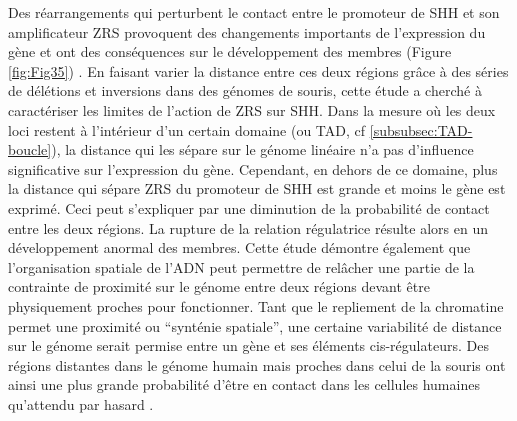Des réarrangements qui perturbent le contact entre le promoteur de \acrshort{SHH} et son \gls{amplificateur} \acrshort{ZRS} provoquent des changements importants de l’expression du gène et ont des conséquences sur le développement des membres (Figure \ref{fig:Fig35}) \citep{symmons_SHH_2016}. En faisant varier la distance entre ces deux régions grâce à des séries de délétions et inversions dans des génomes de souris, cette étude a cherché à caractériser les limites de l’action de \acrshort{ZRS} sur \acrshort{SHH}. Dans la mesure où les deux loci restent à l’intérieur d’un certain domaine (ou \acrshort{TAD}, cf \ref{subsubsec:TAD-boucle}), la distance qui les sépare sur le génome linéaire n’a pas d’influence significative sur l’expression du gène. Cependant, en dehors de ce domaine, plus la distance qui sépare \acrshort{ZRS} du promoteur de \acrshort{SHH} est grande et moins le gène est exprimé. Ceci peut s’expliquer par une diminution de la probabilité de contact entre les deux régions. La rupture de la relation régulatrice résulte alors en un développement anormal des membres. Cette étude démontre également que l’organisation spatiale de l’ADN peut permettre de relâcher une partie de la contrainte de proximité sur le génome entre deux régions devant être physiquement proches pour fonctionner. Tant que le repliement de la chromatine permet une proximité ou “synténie spatiale”, une certaine variabilité de distance sur le génome serait permise entre un gène et ses éléments \gls{cis}-régulateurs. Des régions distantes dans le génome humain mais proches dans celui de la souris ont ainsi une plus grande probabilité d’être en contact dans les cellules humaines qu’attendu par hasard \citep{veron_close_2011}.


